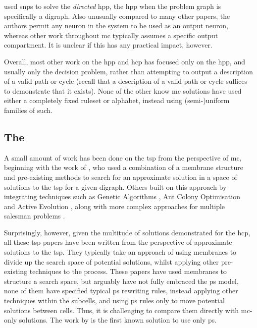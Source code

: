 
\citeauthor{Xue2013} used \gls{snps} to solve the \emph{directed} \gls{hpp}, \ie{} the \gls{hpp} when the problem graph is specifically a digraph.  Also unusually compared to many other papers, the authors permit any neuron in the system to be used as an output neuron, whereas other work throughout \gls{mc} typically assumes a specific output \gls{compartment}.  It is unclear if this has any practical impact, however.


Overall, most other work on the \gls{hpp} and \gls{hcp} has focused only on the \gls{hpp}, and usually only the decision problem, rather than attempting to output a description of a valid path or cycle (recall that a description of a valid path or cycle suffices to demonstrate that it exists).  None of the other know \gls{mc} solutions have used either a completely fixed \gls{ruleset} or alphabet, instead using (semi-)uniform families of such.


\subsection{The }

A small amount of work has been done on the \gls{tsp} from the perspective of \gls{mc}, beginning with the work of \citeauthor{Nishida2006} \cite{Nishida2006}, who used a combination of a membrane structure and pre-existing methods to search for an approximate solution in a space of solutions to the \gls{tsp} for a given digraph.  Others built on this approach by integrating techniques such as Genetic Algorithms \cite{Manalastas2013,He2014}, Ant Colony Optimisation \cite{Zhang2011} and Active Evolution \cite{Song2015}, along with more complex approaches for multiple salesman problems \cite{He2015}.

Surprisingly, however, given the multitude of solutions demonstrated for the \gls{hcp}, all these \gls{tsp} papers have been written from the perspective of approximate solutions to the \gls{tsp}.  They typically take an approach of using membranes to divide up the search space of potential solutions, whilst applying other pre-existing techniques to the process.  These papers have used membranes to structure a search space, but arguably have not fully embraced the \gls{ps} model, \eg{} none of them have specified typical \gls{ps} rewriting rules, instead applying other techniques within the subcells, and using \gls{ps} rules only to move potential solutions between cells.  Thus, it is challenging to compare them directly with \gls{mc}-only solutions.  The work by \citeauthor{Guo2017} \cite{Guo2017} is the first known solution to use only \gls{ps}.

